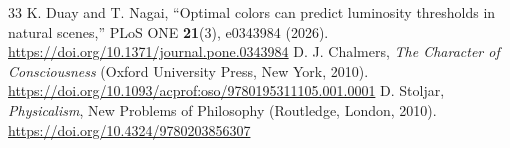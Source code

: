 \documentclass[11pt,letterpaper]{article}
\theoremstyle{plain}
\begin{document}
\begin{thebibliography}{33}
 K. Duay and T. Nagai, ``Optimal colors can predict luminosity thresholds in natural scenes,'' PLoS ONE \textbf{21}(3), e0343984 (2026). \url{https://doi.org/10.1371/journal.pone.0343984}
 D. J. Chalmers, \emph{The Character of Consciousness} (Oxford University Press, New York, 2010). \url{https://doi.org/10.1093/acprof:oso/9780195311105.001.0001}
 D. Stoljar, \emph{Physicalism}, New Problems of Philosophy (Routledge, London, 2010). \url{https://doi.org/10.4324/9780203856307}
\end{thebibliography}
\end{document}
